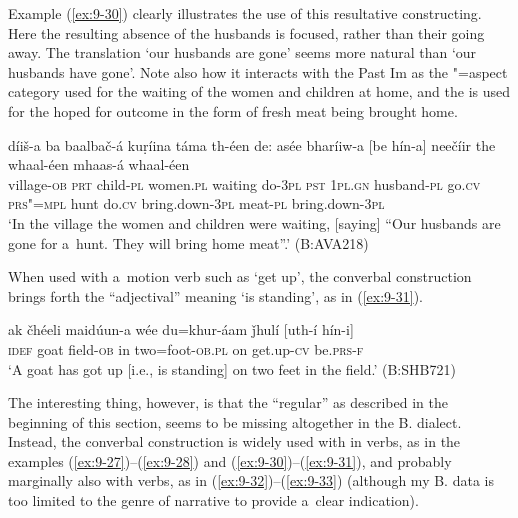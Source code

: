 Example (\ref{ex:9-30}) clearly illustrates the use of this resultative constructing. Here the resulting absence of the husbands is focused, rather than their going away. The translation `our husbands are gone' seems more natural than `our husbands have gone'. Note also how it interacts with the Past Im as the "=aspect category used for the waiting of the women and children at home, and the  is used for the hoped for outcome in the form of fresh meat being brought home.

\begin{exe}
\ex
\label{ex:9-30}
\gll díiš-a ba baalbač-á kuṛíina táma th-éen de: asée bharíiw-a [be hín-a] neečíir the whaal-éen mhaas-á whaal-éen \\
village-\textsc{ob} \textsc{prt} child-\textsc{pl} women.\textsc{pl} waiting  do-\textsc{3pl} \textsc{pst } \textsc{1pl.gn} husband-\textsc{pl} go.\textsc{cv} \textsc{prs"=mpl}  hunt do.\textsc{cv} bring.down-\textsc{3pl} meat-\textsc{pl} bring.down-\textsc{3pl} \\
\glt `In the village the women and children were waiting, [saying] ``Our husbands are gone for a~hunt. They will bring home meat''.' (B:AVA218)
\end{exe}

When used with a~motion verb such as `get up', the converbal construction brings forth the ``adjectival'' meaning `is standing', as in (\ref{ex:9-31}).

\begin{exe}
\ex
\label{ex:9-31}
\gll ak čhéeli maidúun-a wée du=khur-áam ǰhulí [uth-í hín-i] \\
\textsc{idef} goat field-\textsc{ob} in two=foot-\textsc{ob.pl} on get.up-\textsc{cv} be.\textsc{prs-f} \\
\glt `A goat has got up [i.e., is standing] on two feet in the field.' (B:SHB721)
\end{exe}

The interesting thing, however, is that the ``regular''  as described in the beginning of this section, seems to be missing altogether in the B. dialect. Instead, the converbal construction is widely used with in verbs, as in the examples (\ref{ex:9-27})--(\ref{ex:9-28}) and (\ref{ex:9-30})--(\ref{ex:9-31}), and probably marginally also with  verbs, as in (\ref{ex:9-32})--(\ref{ex:9-33}) (although my B. data is too limited to the genre of narrative  to provide a~clear indication).

